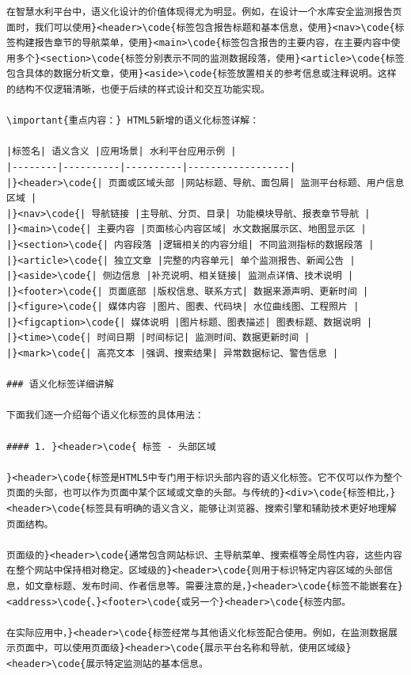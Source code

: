 \begin{lstlisting}
在智慧水利平台中，语义化设计的价值体现得尤为明显。例如，在设计一个水库安全监测报告页面时，我们可以使用}<header>\code{标签包含报告标题和基本信息，使用}<nav>\code{标签构建报告章节的导航菜单，使用}<main>\code{标签包含报告的主要内容，在主要内容中使用多个}<section>\code{标签分别表示不同的监测数据段落，使用}<article>\code{标签包含具体的数据分析文章，使用}<aside>\code{标签放置相关的参考信息或注释说明。这样的结构不仅逻辑清晰，也便于后续的样式设计和交互功能实现。

\important{重点内容：} HTML5新增的语义化标签详解：

|标签名| 语义含义 |应用场景| 水利平台应用示例 |
|--------|----------|----------|------------------|
|}<header>\code{| 页面或区域头部 |网站标题、导航、面包屑| 监测平台标题、用户信息区域 |
|}<nav>\code{| 导航链接 |主导航、分页、目录| 功能模块导航、报表章节导航 |
|}<main>\code{| 主要内容 |页面核心内容区域| 水文数据展示区、地图显示区 |
|}<section>\code{| 内容段落 |逻辑相关的内容分组| 不同监测指标的数据段落 |
|}<article>\code{| 独立文章 |完整的内容单元| 单个监测报告、新闻公告 |
|}<aside>\code{| 侧边信息 |补充说明、相关链接| 监测点详情、技术说明 |
|}<footer>\code{| 页面底部 |版权信息、联系方式| 数据来源声明、更新时间 |
|}<figure>\code{| 媒体内容 |图片、图表、代码块| 水位曲线图、工程照片 |
|}<figcaption>\code{| 媒体说明 |图片标题、图表描述| 图表标题、数据说明 |
|}<time>\code{| 时间日期 |时间标记| 监测时间、数据更新时间 |
|}<mark>\code{| 高亮文本 |强调、搜索结果| 异常数据标记、警告信息 |

### 语义化标签详细讲解

下面我们逐一介绍每个语义化标签的具体用法：

#### 1. }<header>\code{ 标签 - 头部区域

}<header>\code{标签是HTML5中专门用于标识头部内容的语义化标签。它不仅可以作为整个页面的头部，也可以作为页面中某个区域或文章的头部。与传统的}<div>\code{标签相比，}<header>\code{标签具有明确的语义含义，能够让浏览器、搜索引擎和辅助技术更好地理解页面结构。

页面级的}<header>\code{通常包含网站标识、主导航菜单、搜索框等全局性内容，这些内容在整个网站中保持相对稳定。区域级的}<header>\code{则用于标识特定内容区域的头部信息，如文章标题、发布时间、作者信息等。需要注意的是，}<header>\code{标签不能嵌套在}<address>\code{、}<footer>\code{或另一个}<header>\code{标签内部。

在实际应用中，}<header>\code{标签经常与其他语义化标签配合使用。例如，在监测数据展示页面中，可以使用页面级}<header>\code{展示平台名称和导航，使用区域级}<header>\code{展示特定监测站的基本信息。

\end{lstlisting}

